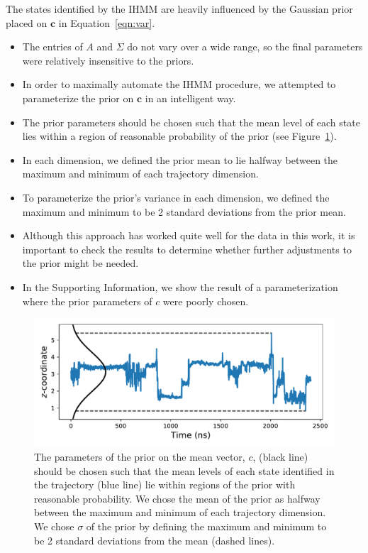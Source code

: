 \documentclass{article}
\begin{document}
  The states identified by the IHMM are heavily influenced by the Gaussian prior
  placed on $\mathbf{c}$ in Equation~\ref{eqn:var}.
  \begin{itemize}
    \item The entries of $A$ and $\Sigma$ do not vary over a wide range, so
    the final parameters were relatively insensitive to the priors.
    \item In order to maximally automate the IHMM procedure, we attempted to
    parameterize the prior on $\mathbf{c}$ in an intelligent way.
    \item The prior parameters should be chosen such that the mean level of 
    each state lies within a region of reasonable probability of the prior (see
    Figure~\ref{fig:prior_guesses}).
    \item In each dimension, we defined the prior mean to lie halfway between the 
    maximum and minimum of each trajectory dimension. 
    \item To parameterize the prior's variance in each dimension, we defined the
    maximum and minimum to be 2 standard deviations from the prior mean.
    \item Although this approach has worked quite well for the data in this work,
    it is important to check the results to determine whether further adjustments
    to the prior might be needed.
    \item In the Supporting Information, we show the result of a parameterization
    where the prior parameters of $c$ were poorly chosen. %
  \end{itemize}
  
  \begin{figure}
  \centering
  \includegraphics[width=\textwidth]{prior_guesses.pdf}
  \caption{The parameters of the prior on the mean vector, $c$, (black line) should be chosen such
  that the mean levels of each state identified in the trajectory (blue line) lie within
  regions of the prior with reasonable probability. We chose the mean of the prior 
  as halfway between the maximum and minimum of each trajectory dimension. We chose 
  $\sigma$ of the prior by defining the maximum and minimum to be 2 standard deviations
  from the mean (dashed lines).}\label{fig:prior_guesses}
  \end{figure}
  
\end{document}
